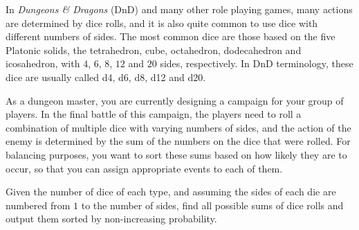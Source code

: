 
%
In \emph{Dungeons \& Dragons} (DnD) and many other role playing games, many
actions are determined by dice rolls, and it is also quite common to use dice
with different numbers of sides. The most common dice are those based on the
five Platonic solids, the tetrahedron, cube, octahedron, dodecahedron and
icosahedron, with $4$, $6$, $8$, $12$ and $20$ sides, respectively. In DnD
terminology, these dice are usually called d4, d6, d8, d12 and d20.

As a dungeon master, you are currently designing a campaign for your group of
players. In the final battle of this campaign, the players need to roll a
combination of multiple dice with varying numbers of sides, and the action of
the enemy is determined by the sum of the numbers on the dice that were rolled.
For balancing purposes, you want to sort these sums based on how likely they
are to occur, so that you can assign appropriate events to each of them.

Given the number of dice of each type, and assuming the sides of each die are
numbered from $1$ to the number of sides, find all possible sums of dice rolls
and output them sorted by non-increasing probability.

